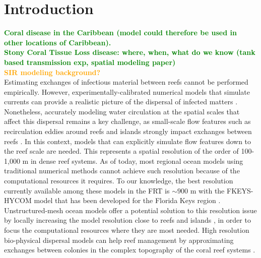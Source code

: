 \documentclass[utf8]{frontiersSCNS}
\newcommand{\erinn}[1]{\textbf{\textcolor{green}{#1}}}
\newcommand{\dan}[1]{\textbf{\textcolor{orange}{#1}}}
\newcommand{\dobby}[1]{\textbf{\color{violet}{#1}}}
\begin{document}
\section{Introduction}
\erinn{Coral disease in the Caribbean (model could therefore be used in other locations of Caribbean). \\Stony Coral Tissue Loss disease: where, when, what do we know (tank based transmission exp, spatial modeling paper)} \\
\dan{SIR modeling background?} \\
\dobby{Hydrodynamic modeling:} Estimating exchanges of infectious material between reefs cannot be performed empirically. However, experimentally-calibrated numerical models that simulate currents can provide a realistic picture of the dispersal of infected matters \dobby{[Insist more on necessity of using models ?]}. Nonetheless, accurately modeling water circulation at the spatial scales that affect this dispersal remains a key challenge, as small-scale flow features such as recirculation eddies around reefs and islands strongly impact exchanges between reefs \citep{wolanski1994physical, burgess2007influence, figueiredo2013synthesizing}. In this context, models that can explicitly simulate flow features down to the reef scale are needed. This represents a spatial resolution of the order of 100-1,000 m in dense reef systems. As of today, most regional ocean models using traditional numerical methods cannot achieve such resolution because of the computational resources it requires. To our knowledge, the best resolution currently available among these models in the FRT is $\sim900$ m with the FKEYS-HYCOM model that has been developed for the Florida Keys region \citep{kourafalou2012florida, sponaugle2012observed, vaz2016perfect}.
Unstructured-mesh ocean models offer a potential solution to this resolution issue by locally increasing the model resolution close to reefs and islands \citep{lambrechts2008multi, thomas2014numerical, thomas2015connectivity}, in order to focus the computational resources where they are most needed. High resolution bio-physical dispersal models can help reef management by approximating exchanges between colonies in the complex topography of the coral reef systems \citep{frys20}. \\
\dobby{Applications of our methodology (= modeling hydro + deduce other things) e.g connectivity ?}\\
\dobby{Other applications of SIR model with hydro/networks ?}
\end{document}
